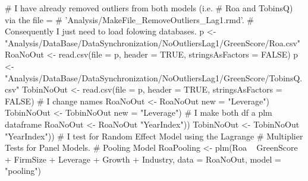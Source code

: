 \documentclass[12pt,]{article}
\newenvironment{Shaded}{}{}
\newcommand{\KeywordTok}[1]{\textcolor[rgb]{0.00,0.00,1.00}{#1}}
\newcommand{\DataTypeTok}[1]{#1}
\newcommand{\StringTok}[1]{\textcolor[rgb]{0.00,0.50,0.50}{#1}}
\newcommand{\CommentTok}[1]{\textcolor[rgb]{0.00,0.50,0.00}{#1}}
\newcommand{\OtherTok}[1]{\textcolor[rgb]{1.00,0.25,0.00}{#1}}
\newcommand{\OperatorTok}[1]{#1}
\newcommand{\NormalTok}[1]{#1}
\begin{document}
\begin{Shaded}
\begin{Highlighting}[]
\CommentTok{# I have already removed outliers from both models (i.e.}
\CommentTok{# Roa and TobinsQ) via the file =}
\CommentTok{# 'Analysis/MakeFile_RemoveOutliers_Lag1.rmd'.}
\CommentTok{# Consequently I just need to load folowing databases.}
\NormalTok{p <-}\StringTok{ "Analysis/DataBase/DataSynchronization/NoOutliersLag1/GreenScore/Roa.csv"}
\NormalTok{RoaNoOut <-}\StringTok{ }\KeywordTok{read.csv}\NormalTok{(}\DataTypeTok{file =}\NormalTok{ p, }\DataTypeTok{header =} \OtherTok{TRUE}\NormalTok{, }\DataTypeTok{stringsAsFactors =} \OtherTok{FALSE}\NormalTok{)}
\NormalTok{p <-}\StringTok{ "Analysis/DataBase/DataSynchronization/NoOutliersLag1/GreenScore/TobinsQ.csv"}
\NormalTok{TobinNoOut <-}\StringTok{ }\KeywordTok{read.csv}\NormalTok{(}\DataTypeTok{file =}\NormalTok{ p, }\DataTypeTok{header =} \OtherTok{TRUE}\NormalTok{, }\DataTypeTok{stringsAsFactors =} \OtherTok{FALSE}\NormalTok{)}
\CommentTok{# I change names}
\NormalTok{RoaNoOut <-}\StringTok{ }\NormalTok{RoaNoOut }\OperatorTok{%
    \DataTypeTok{new =} \StringTok{"Leverage"}\NormalTok{)}
\NormalTok{TobinNoOut <-}\StringTok{ }\NormalTok{TobinNoOut }\OperatorTok{%
    \DataTypeTok{new =} \StringTok{"Leverage"}\NormalTok{)}
\CommentTok{# I make both df a plm dataframe}
\NormalTok{RoaNoOut <-}\StringTok{ }\NormalTok{RoaNoOut }\OperatorTok{%
    \StringTok{"YearIndex"}\NormalTok{))}
\NormalTok{TobinNoOut <-}\StringTok{ }\NormalTok{TobinNoOut }\OperatorTok{%
    \StringTok{"YearIndex"}\NormalTok{))}
\CommentTok{# I test for Random Effect Model using the Lagrange}
\CommentTok{# Multiplier Tests for Panel Models.}
\CommentTok{# Pooling Model}
\NormalTok{RoaPooling <-}\StringTok{ }\KeywordTok{plm}\NormalTok{(Roa }\OperatorTok{~}\StringTok{ }\NormalTok{GreenScore }\OperatorTok{+}\StringTok{ }\NormalTok{FirmSize }\OperatorTok{+}\StringTok{ }\NormalTok{Leverage }\OperatorTok{+}\StringTok{ }
\StringTok{    }\NormalTok{Growth }\OperatorTok{+}\StringTok{ }\NormalTok{Industry, }\DataTypeTok{data =}\NormalTok{ RoaNoOut, }\DataTypeTok{model =} \StringTok{"pooling"}\NormalTok{)}
}}}}
\end{Highlighting}
\end{Shaded}
\end{document}
